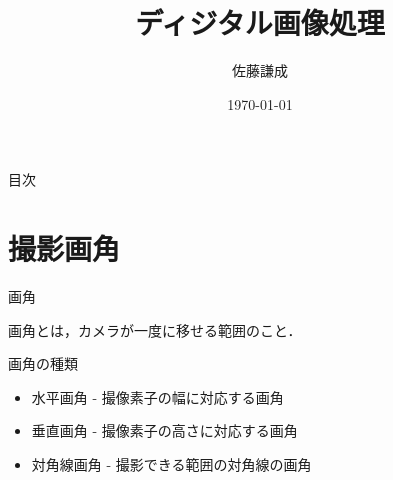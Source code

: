 \documentclass[8pt, jfont=ipaexm, t]{beamer} %
\title{ディジタル画像処理}
\institute{画像情報工学研究室}
\author{佐藤謙成}
\date{\today}
\begin{document}
\maketitle

\begin{frame}{目次}
    \tableofcontents
\end{frame}

\section{撮影画角}
\begin{frame}{画角}
  \begin{block}{}
    画角とは，カメラが一度に移せる範囲のこと．
  \end{block}
  \begin{block}{画角の種類}
    \begin{itemize}
      \item 水平画角 - 撮像素子の幅に対応する画角
      \item 垂直画角 - 撮像素子の高さに対応する画角
      \item 対角線画角 - 撮影できる範囲の対角線の画角
    \end{itemize}
  \end{block}
\end{frame}
\end{document}
